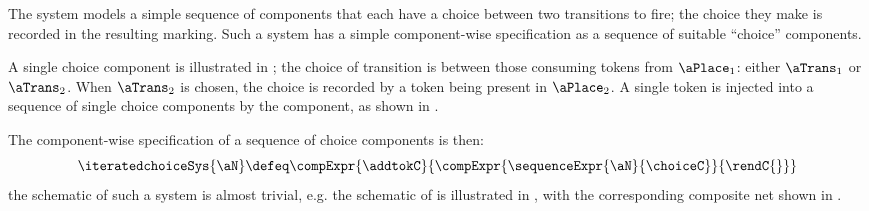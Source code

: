 The \iteratedchoiceSys{\aN} system models a simple sequence of components that
each have a choice between two transitions to fire; the choice they make is
recorded in the resulting marking. Such a system has a simple component-wise
specification as a sequence of suitable ``choice'' components.

A single choice component is illustrated in ;
the choice of transition is between those consuming tokens from $\aPlace_1$:
either $\aTrans_1$ or $\aTrans_2$. When $\aTrans_2$ is chosen, the choice is
recorded by a token being present in $\aPlace_2$. A single token is injected
into a sequence of single choice components by the \addtokC{} component, as
shown in .

\begin{figure}[ht]
    \centering
    \begin{subfigure}{0.5\textwidth}
    \centering
    \caption{\addtokC {}}
    \label{fig:addtokC}
    \end{subfigure}%
    \begin{subfigure}{0.5\textwidth}
    \centering
    \caption{\choiceC {}}
    \label{fig:iter-choiceComponent}
    \end{subfigure}%
\end{figure}

The component-wise specification of a sequence of choice components is then:
\[
    \iteratedchoiceSys{\aN} \defeq
    \compExpr{\addtokC}{\compExpr{\sequenceExpr{\aN}{\choiceC}}{\rendC{}}}
\]
the schematic of such a system is almost trivial, e.g.  the schematic of
 is illustrated in , with
the corresponding composite net shown in .

